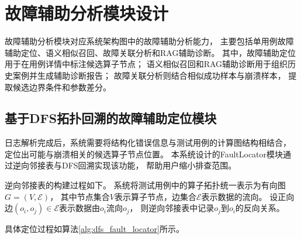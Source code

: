 \section{故障辅助分析模块设计}

故障辅助分析模块对应系统架构图中的故障辅助分析能力，
主要包括单用例故障辅助定位、语义相似召回、故障关联分析和RAG辅助诊断。
其中，故障辅助定位用于在用例详情中标注候选算子节点；
语义相似召回和RAG辅助诊断用于组织历史案例并生成辅助诊断报告；
故障关联分析则结合相似成功样本与崩溃样本，
提取候选边界条件和参数差分。

\subsection{基于DFS拓扑回溯的故障辅助定位模块}

日志解析完成后，系统需要将结构化错误信息与测试用例的计算图结构相结合，
定位出可能与崩溃相关的候选算子节点位置。
本系统设计的FaultLocator模块通过逆向邻接表与DFS回溯实现该功能，
帮助用户缩小排查范围。

逆向邻接表的构建过程如下。
系统将测试用例中的算子拓扑统一表示为有向图$G=(V,\mathcal{E})$，
其中节点集合$V$表示算子节点，边集合$\mathcal{E}$表示数据的流向。
设正向边$(o_i,o_j)\in\mathcal{E}$表示数据由$o_i$流向$o_j$，
则逆向邻接表中记录$o_j$到$o_i$的反向关系。

具体定位过程如算法\ref{alg:dfs_fault_locator}所示。

